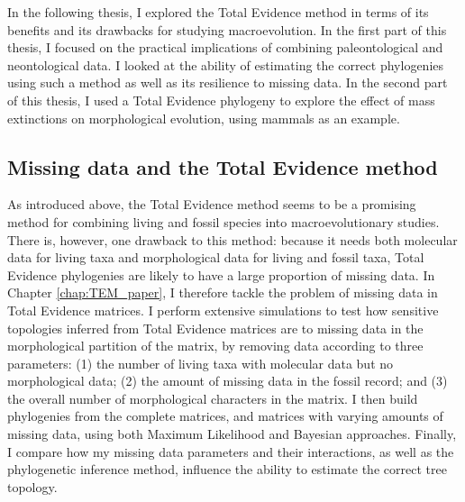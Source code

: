 In the following thesis, I explored the Total Evidence method in terms of its benefits and its drawbacks for studying macroevolution.
In the first part of this thesis, I focused on the practical implications of combining paleontological and neontological data.
I looked at the ability of estimating the correct phylogenies using such a method as well as its resilience to missing data.
In the second part of this thesis, I used a Total Evidence phylogeny to explore the effect of mass extinctions on morphological evolution, using mammals as an example.

%
%


\subsection{Missing data and the Total Evidence method}
As introduced above, the Total Evidence method seems to be a promising method for combining living and fossil species into macroevolutionary studies.
There is, however, one drawback to this method: because it needs both molecular data for living taxa and morphological data for living and fossil taxa, Total Evidence phylogenies are likely to have a large proportion of missing data.
In Chapter \ref{chap:TEM_paper}, I therefore tackle the problem of missing data in Total Evidence matrices.
I perform extensive simulations to test how sensitive topologies inferred from Total Evidence matrices are to missing data in the morphological partition of the matrix, by removing data according to three parameters: (1) the number of living taxa with molecular data but no morphological data; (2) the amount of missing data in the fossil record; and (3) the overall number of morphological characters in the matrix.
I then build phylogenies from the complete matrices, and matrices with varying amounts of missing data, using both Maximum Likelihood and Bayesian approaches.
Finally, I compare how my missing data parameters and their interactions, as well as the phylogenetic inference method, influence the ability to estimate the correct tree topology.

